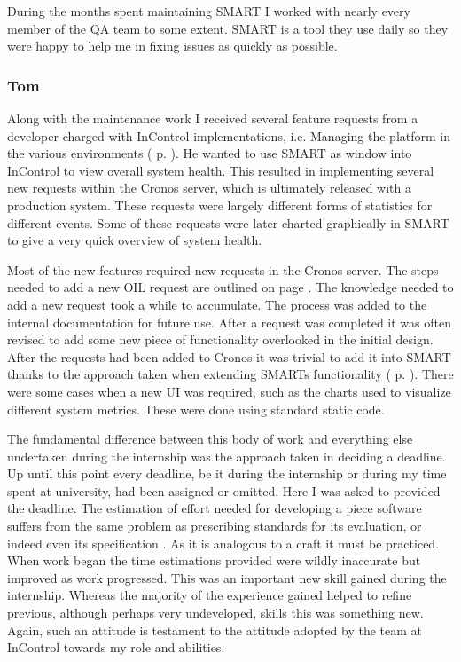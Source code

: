 \documentclass[a4paper, 11pt, titlepage]{article}
\begin{document}
During the months spent maintaining SMART I worked with nearly every member of the QA team to some extent. SMART is a tool they use daily so they were happy to help me in fixing issues as quickly as possible. 
 
\subsubsection{Tom} 
Along with the maintenance work I received several feature requests from a developer charged with InControl implementations, i.e. Managing the platform in the various environments ( p. \pageref{release_environments} ). He wanted to use SMART as window into InControl to view overall system health. This resulted in implementing several new requests within the Cronos server, which is ultimately released with a production system. These requests were largely different forms of statistics for different events. Some of these requests were later charted graphically in SMART to give a very quick overview of system health. 

Most of the new features required new requests in the Cronos server. The steps needed to add a new OIL request are outlined on page \pageref{OIL}. The knowledge needed to add a new request took a while to accumulate. The process was added to the internal documentation for future use. After a request was completed it was often revised to add some new piece of functionality overlooked in the initial design. After the requests had been added to Cronos it was trivial to add it into SMART thanks to the approach taken when extending SMARTs functionality ( p. \pageref{dynamic_smart} ). There were some cases when a new UI was required, such as the charts used to visualize different system metrics. These were done using standard static code.

The fundamental difference between this body of work and everything else undertaken during the internship was the approach taken in deciding a deadline. Up until this point every deadline, be it during the internship or during my time spent at university, had been assigned or omitted. Here I was asked to provided the deadline. The estimation of effort needed for developing a piece software suffers from the same problem as prescribing standards for its evaluation, or indeed even its specification \cite{NoBullet} \cite{cMellonTest}. As it is analogous to a craft it must be practiced. When work began the time estimations provided were wildly inaccurate but improved as work progressed. This was an important new skill gained during the internship. Whereas the majority of the experience gained helped to refine previous, although perhaps very undeveloped, skills this was something new. Again, such an attitude is testament to the attitude adopted by the team at InControl towards my role and abilities.
\end{document}
